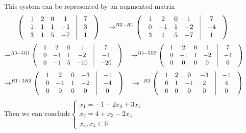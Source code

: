 \documentclass{article}
\theoremstyle{definition}
\theoremstyle{thrm}
\begin{document}
This system can be represented by an augmented matrix
\begin{equation*}
	\begin{pmatrix}
		&1 & 2 & 0 & 1 &\vline&7&\\
		&1 & 1 & 1 & -1 &\vline&3&\\
		&3 & 1 & 5 & -7 &\vline&1&\\
	\end{pmatrix}\quad \rightarrow^{R2-R1}
	\begin{pmatrix}
		&1 & 2 & 0 & 1 &\vline&7&\\
		&0 & -1 & 1 & -2 &\vline&-4&\\
		&3 & 1 & 5 & -7 &\vline&1&\\
	\end{pmatrix}\\ \quad 
\end{equation*}
\begin{equation*}
	\rightarrow^{R3-3R1} 
	\begin{pmatrix}
		&1 & 2 & 0 & 1 &\vline&7&\\
		&0 & -1 & 1 & -2 &\vline&-4&\\
		&0 & -1 & 5 & -10 &\vline&-20&\\
	\end{pmatrix}\quad \rightarrow^{R3-5R2}
	\begin{pmatrix}
		&1 & 2 & 0 & 1 &\vline&7&\\
		&0 & -1 & 1 & -2 &\vline&-4&\\
		&0 & 0 & 0 & 0 &\vline&0&\\
	\end{pmatrix}\quad
\end{equation*}
\begin{equation*}
	\rightarrow^{R1+2R2} 
	\begin{pmatrix}
		&1 & 2 & 0 & -3 &\vline&-1&\\
		&0 & -1 & 1 & -2 &\vline&-4&\\
		&0 & 0 & 0 & 0 &\vline&0&\\
	\end{pmatrix}\quad \rightarrow^{-R2}
	\begin{pmatrix}
		&1 & 2 & 0 & -3 &\vline&-1&\\
		&0 & 1 & -1 & 2 &\vline&4&\\
		&0 & 0 & 0 & 0 &\vline&0&\\
	\end{pmatrix}\quad
\end{equation*}
Then we can conclude$
\begin{cases}
	x_1 = -1-2x_3+3x_4\\
	x_2 = 4+x_3-2x_4\\
	x_3,x_4 \in \mathbb{R}
\end{cases}$
\end{document}
